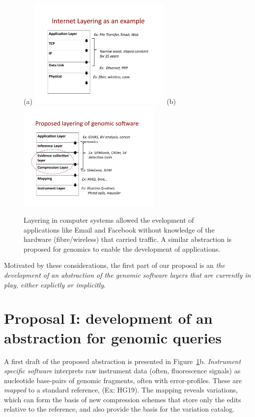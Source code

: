 \documentclass[11pt]{article}
\begin{document}
\begin{figure}[h]
  \centering
(a)  \includegraphics[width=2.75in]{fig/TCPlayer.pdf}
(b)  \includegraphics[width=2.75in]{fig/genomiclayer.pdf}
\caption{Layering in computer systems allowed the evelopment of
  applications like Email and Facebook without knowledge of the
  hardware (fibre/wireless) that carried traffic. A similar
  abstraction is proposed for genomics to enable the development of
  applications.}
  \label{fig:layer}
\end{figure}

Motivated by these considerations, the first part of our proposal is
an \emph{ the development of an abstraction of the genomic software
  layers that are currently in play, either explictly or implicitly}.

\section{Proposal  I: development of an abstraction for genomic queries}
A first draft of the proposed abstraction is presented in
Figure~\ref{fig:layer}b. \emph{Instrument specific software}
interprets raw instrument data (often, fluorescence signals) as
nucleotide base-pairs of genomic fragments, often with
error-profiles. These are \emph{mapped} to a standard reference, (Ex:
HG19). The mapping reveals variations, which can form the basis of new
compression schemes that store only the edits relative to the
reference, and also provide the basis for the variation catalog.
\end{document}
